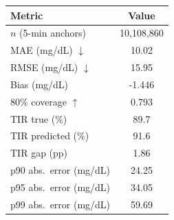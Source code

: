 \begin{tabular}{lc}
\toprule
Metric & Value \\
\midrule
$n$ (5-min anchors) & 10,108,860 \\
MAE (mg/dL) $\downarrow$ & 10.02 \\
RMSE (mg/dL) $\downarrow$ & 15.95 \\
Bias (mg/dL) & -1.446 \\
80\% coverage $\uparrow$ & 0.793 \\
TIR true (\%) & 89.7 \\
TIR predicted (\%) & 91.6 \\
TIR gap (pp) & 1.86 \\
p90 abs.~error (mg/dL) & 24.25 \\
p95 abs.~error (mg/dL) & 34.05 \\
p99 abs.~error (mg/dL) & 59.69 \\
\bottomrule
\end{tabular}
